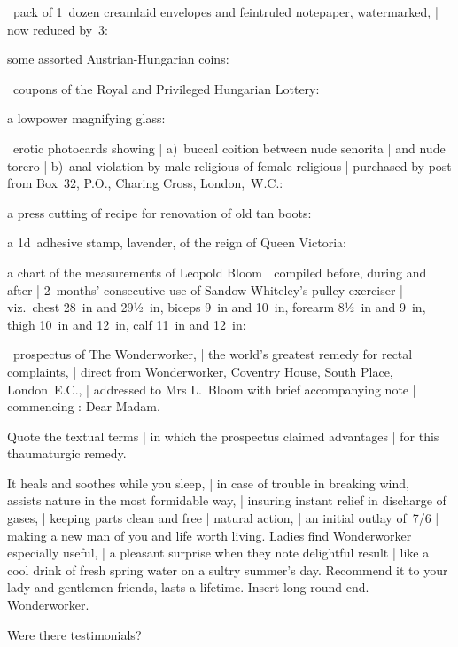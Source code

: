 ~pack of 1~dozen creamlaid envelopes and feintruled notepaper, watermarked, |
now reduced by~3:

\Places
some assorted Austrian-Hungarian coins:

~coupons of the Royal and Privileged Hungarian Lottery:

\Science
a lowpower magnifying glass:

~erotic photocards showing |
a)~buccal coition between nude senorita
 |
and nude torero
 |
b)~anal violation by male religious
of female religious
 |
purchased by post from Box~32, P.O., Charing Cross, London,~W.C.:

\Philosophy
a press cutting of recipe for renovation of old tan boots:

\Poetry
a 1d~adhesive stamp, lavender, of the reign of Queen Victoria:

\Factual
a chart of the measurements of Leopold Bloom |
compiled before, during and after |
2~months' consecutive use of Sandow-Whiteley's pulley exerciser
 |
viz.\ chest 28~in and 29½~in,
biceps 9~in and 10~in,
forearm 8½~in and 9~in,
thigh 10~in and 12~in,
calf 11~in and 12~in:

~prospectus of The Wonderworker, |
the world's greatest remedy for rectal complaints, |
direct from Wonderworker, Coventry House, South Place, London~E.C., |
addressed
to Mrs L.~Bloom with brief accompanying note |
commencing
:
Dear Madam.


Quote the textual terms |
in which the prospectus claimed advantages |
for this thaumaturgic remedy.

\Adverts
It heals and soothes while you sleep, |
in case of trouble in breaking wind, |
assists nature in the most formidable way, |
insuring instant relief in discharge of gases, |
keeping parts clean and free |
natural action, |
an initial outlay of~7/6 |
making a new man of you and life worth living.
Ladies find Wonderworker especially useful, |
a pleasant surprise when they note delightful result |
like a cool drink of fresh spring water on a sultry summer's day.
Recommend it to your lady and gentlemen friends,
lasts a lifetime.
Insert long round end.
Wonderworker.


Were there testimonials?

